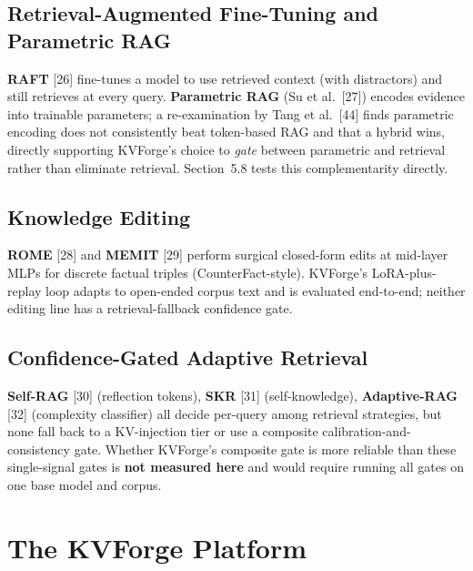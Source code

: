 \hypertarget{retrieval-augmented-fine-tuning-and-parametric-rag}{%
\subsection{Retrieval-Augmented Fine-Tuning and Parametric RAG}\label{retrieval-augmented-fine-tuning-and-parametric-rag}}

\textbf{RAFT} {[}26{]} fine-tunes a model to use retrieved context (with distractors) and still retrieves at every query. \textbf{Parametric RAG} (Su et al.~{[}27{]}) encodes evidence into trainable parameters; a re-examination by Tang et al.~{[}44{]} finds parametric encoding does not consistently beat token-based RAG and that a hybrid wins, directly supporting KVForge's choice to \emph{gate} between parametric and retrieval rather than eliminate retrieval. Section~5.8 tests this complementarity directly.

\hypertarget{knowledge-editing}{%
\subsection{Knowledge Editing}\label{knowledge-editing}}

\textbf{ROME} {[}28{]} and \textbf{MEMIT} {[}29{]} perform surgical closed-form edits at mid-layer MLPs for discrete factual triples (CounterFact-style). KVForge's LoRA-plus-replay loop adapts to open-ended corpus text and is evaluated end-to-end; neither editing line has a retrieval-fallback confidence gate.

\hypertarget{confidence-gated-adaptive-retrieval}{%
\subsection{Confidence-Gated Adaptive Retrieval}\label{confidence-gated-adaptive-retrieval}}

\textbf{Self-RAG} {[}30{]} (reflection tokens), \textbf{SKR} {[}31{]} (self-knowledge), \textbf{Adaptive-RAG} {[}32{]} (complexity classifier) all decide per-query among retrieval strategies, but none fall back to a KV-injection tier or use a composite calibration-and-consistency gate. Whether KVForge's composite gate is more reliable than these single-signal gates is \textbf{not measured here} and would require running all gates on one base model and corpus.

\hypertarget{the-kvforge-platform}{%
\section{The KVForge Platform}\label{the-kvforge-platform}}

